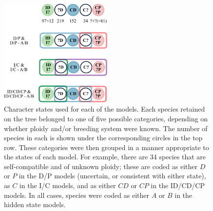\begin{figure}
\centering
\includegraphics[width=0.5\textwidth]{states.pdf}
\caption{
Character states used for each of the models.
Each species retained on the tree belonged to one of five possible categories, depending on whether ploidy and/or breeding system were known.
The number of species in each is shown under the corresponding circles in the top row.
These categories were then grouped in a manner appropriate to the states of each model.
For example, there are 34 species that are self-compatible and of unknown ploidy; these are coded as either $D$ or $P$ in the D/P models (uncertain, or consistent with either state), as $C$ in the I/C models, and as either $CD$ or $CP$ in the ID/CD/CP models.
In all cases, species were coded as either $A$ or $B$ in the hidden state models.
}
\label{figure:stateclassifications}
\end{figure}


